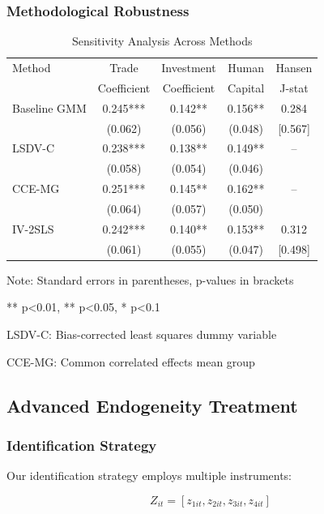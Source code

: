 \documentclass[12pt,a4paper]{article}
\theoremstyle{definition}
\begin{document}
\subsubsection{Methodological Robustness}
\begin{table}[H]
\centering
\caption{Sensitivity Analysis Across Methods}
\begin{threeparttable}
\begin{tabular}{lcccc}
\toprule
Method & Trade & Investment & Human & Hansen \\
 & Coefficient & Coefficient & Capital & J-stat \\
\midrule
Baseline GMM & 0.245*** & 0.142** & 0.156** & 0.284 \\
 & (0.062) & (0.056) & (0.048) & [0.567] \\
LSDV-C & 0.238*** & 0.138** & 0.149** & -- \\
 & (0.058) & (0.054) & (0.046) & \\
CCE-MG & 0.251*** & 0.145** & 0.162** & -- \\
 & (0.064) & (0.057) & (0.050) & \\
IV-2SLS & 0.242*** & 0.140** & 0.153** & 0.312 \\
 & (0.061) & (0.055) & (0.047) & [0.498] \\
\bottomrule
\end{tabular}
\begin{tablenotes}
\small
\item Note: Standard errors in parentheses, p-values in brackets
\item *** p<0.01, ** p<0.05, * p<0.1
\item LSDV-C: Bias-corrected least squares dummy variable
\item CCE-MG: Common correlated effects mean group
\end{tablenotes}
\end{threeparttable}
\end{table}

\subsection{Advanced Endogeneity Treatment}
\subsubsection{Identification Strategy}
Our identification strategy employs multiple instruments:

\begin{equation}
Z_{it} = [z_{1it}, z_{2it}, z_{3it}, z_{4it}]
\end{equation}
\end{document}
